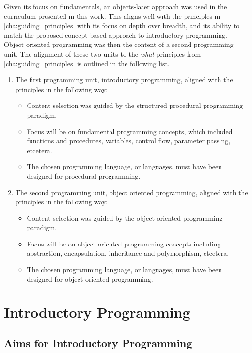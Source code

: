 Given its focus on fundamentals, an objects-later approach was used in the curriculum presented in this work. This aligns well with the principles in \cref{cha:guiding_principles} with its focus on depth over breadth, and its ability to match the proposed concept-based approach to introductory programming. Object oriented programming was then the content of a second programming unit. The alignment of these two units to the \emph{what} principles from \cref{cha:guiding_principles} is outlined in the following list.
\begin{enumerate}
	\item The first programming unit, introductory programming, aligned with the principles in the following way:
	\begin{itemize}[noitemsep,nolistsep]
		\item Content selection was guided by the structured procedural programming paradigm.
		\item Focus will be on fundamental programming concepts, which included functions and procedures, variables, control flow, parameter passing, etcetera.
		\item The chosen programming language, or languages, must have been designed for procedural programming.
	\end{itemize}
	\item The second programming unit, object oriented programming, aligned with the principles in the following way:
	\begin{itemize}[noitemsep,nolistsep]
		\item Content selection was guided by the object oriented programming paradigm.
		\item Focus will be on object oriented programming concepts including abstraction, encapsulation, inheritance and polymorphism, etcetera.
		\item The chosen programming language, or languages, must have been designed for object oriented programming.
	\end{itemize}
\end{enumerate}




\section{Introductory Programming} %
\label{sec:introductory_programming}

\subsection{Aims for Introductory Programming} %
\label{ssub:intro:aims}

